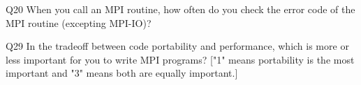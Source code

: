 \begin{description}%
\item{Q20} When you call an MPI routine, how often do you check the error code of the MPI routine  (excepting MPI-IO)?%
\item{Q29} In the tradeoff between code portability and performance, which is more or less important for you to write MPI programs? ["1" means portability is the most important and "3" means both are equally important.]%
\end{description}%
